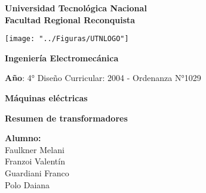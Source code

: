 \documentclass[a4paper, 15pt,titlepage]{article}
\begin{document}
	\begin{titlepage}
		\begin{center}		
			{\huge \textbf{Universidad Tecnológica Nacional}}\\
			{\huge \textbf{Facultad Regional Reconquista}}
			
			\vspace{1cm}
			
			\texttt{[image: "../Figuras/UTNLOGO"]}\\
			
			\vspace{1cm}
			
			{\huge\textbf{Ingeniería Electromecánica}}
			
			\vspace{1cm}
			
			{\textbf{Año}: 4°} \hspace{5cm}  {Diseño Curricular: 2004 - Ordenanza N°1029 }
			
			\vspace{1cm}
			
			{{\LARGE  \textbf{Máquinas eléctricas}}}
			\vspace{1cm}
			
			{\LARGE \textbf{Resumen de transformadores}}
			
		\end{center}
		
		\begin{flushleft}
			\Large
			\textbf{Alumno:}\\
			\vspace{5mm}
			\hspace{3cm}Faulkner Melani\\
			\hspace{3cm}Franzoi Valentín\\
			\hspace{3cm}Guardiani Franco\\
			\hspace{3cm}Polo Daiana
		\end{flushleft}
	\end{titlepage}
	
\end{document}

